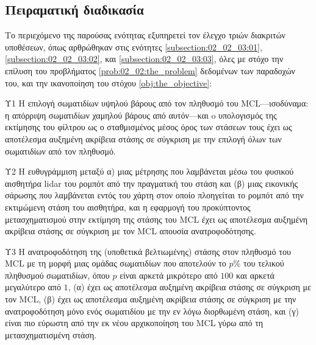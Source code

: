 \subsection{Πειραματική διαδικασία}
\label{subsection:02_02_04:01}

Το περιεχόμενο της παρούσας ενότητας εξυπηρετεί τον έλεγχο τριών διακριτών
υποθέσεων, όπως αρθρώθηκαν στις ενότητες \ref{subsection:02_02_03:01},
\ref{subsection:02_02_03:02}, και \ref{subsection:02_02_03:03}, όλες με στόχο
την επίλυση του προβλήματος \ref{prob:02_02:the_problem} δεδομένων των
παραδοχών του, και την ικανοποίηση του στόχου \ref{obj:the_objective}:

\begin{customhypothesis}{Υ1}
\label{hypothesis:02_02_04:01}
Η επιλογή σωματιδίων υψηλού βάρους από τον πληθυσμό του MCL---ισοδύναμα: η
απόρριψη σωματιδίων χαμηλού βάρους από αυτόν---και o υπολογισμός της
εκτίμησης του φίλτρου ως ο σταθμισμένος μέσος όρος των στάσεων τους έχει ως
αποτέλεσμα αυξημένη ακρίβεια στάσης σε σύγκριση με την επιλογή όλων των
σωματιδίων από τον πληθυσμό.
\end{customhypothesis}

\begin{customhypothesis}{Υ2}
\label{hypothesis:02_02_04:02}
Η ευθυγράμμιση μεταξύ α) μιας μέτρησης που λαμβάνεται μέσω του φυσικού
αισθητήρα lidar του ρομπότ από την πραγματική του στάση και (β) μιας
εικονικής σάρωσης που λαμβάνεται εντός του χάρτη στον οποίο πλοηγείται το
ρομπότ από την εκτιμώμενη στάση του αισθητήρα, και η εφαρμογή του
προκύπτοντος μετασχηματισμού στην εκτίμηση της στάσης του MCL έχει ως
αποτέλεσμα αυξημένη ακρίβεια στάσης σε σύγκριση με τον MCL απουσία
ανατροφοδότησης.
\end{customhypothesis}

\begin{customhypothesis}{Υ3}
\label{hypothesis:02_02_04:03}
Η ανατροφοδότηση της (υποθετικά βελτιωμένης) στάσης στον πληθυσμό του MCL με τη
μορφή μιας ομάδας σωματιδίων που αποτελούν το $p\%$ του τελικού πληθυσμού
σωματιδίων, όπου $p$ είναι αρκετά μικρότερο από $100$ και αρκετά μεγαλύτερο
από $1$, (α) έχει ως αποτέλεσμα αυξημένη ακρίβεια στάσης σε σύγκριση με τον
MCL, (β) έχει ως αποτέλεσμα αυξημένη ακρίβεια στάσης σε σύγκριση με την
ανατροφοδότηση μόνο ενός σωματιδίου με την εν λόγω διορθωμένη στάση, και (γ)
είναι πιο εύρωστη από την εκ νέου αρχικοποίηση του MCL γύρω από τη
μετασχηματισμένη στάση.
\end{customhypothesis}

